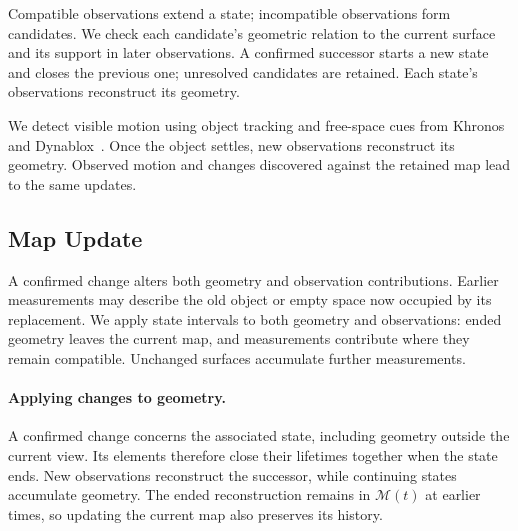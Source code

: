 Compatible observations extend a state; incompatible observations form candidates. We check each
candidate's geometric relation to the current surface and its support in later observations.
A confirmed successor starts a new state and closes the previous one; unresolved candidates are retained.
Each state's observations reconstruct its geometry.

We detect visible motion using object tracking and free-space cues from Khronos and
Dynablox~\cite{schmid2024khronos,schmid2023dynablox}. Once the object settles, new observations reconstruct
its geometry. Observed motion and changes discovered against the retained map lead to the same updates.

\subsection{Map Update}
\label{sec:validity}

A confirmed change alters both geometry and observation contributions.
Earlier measurements may describe the old object or empty space now occupied by its replacement.
We apply state intervals to both geometry and observations: ended geometry leaves the current map, and
measurements contribute where they remain compatible. Unchanged surfaces accumulate further measurements.

\paragraph{Applying changes to geometry.}
A confirmed change concerns the associated state, including geometry outside the current view.
Its elements therefore close their lifetimes together when the state ends. New observations reconstruct
the successor, while continuing states accumulate geometry. The ended reconstruction remains in
$\mathcal{M}(t)$ at earlier times, so updating the current map also preserves its history.

